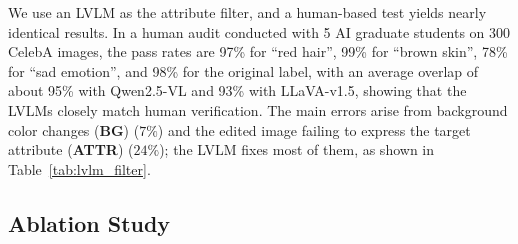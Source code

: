 \documentclass[10pt]{article} %
\newcommand{\qwen}{Qwen2.5-VL\xspace}
\newcommand{\llava}{LLaVA-v1.5\xspace}
\begin{document}
\begin{table}
\vspace{-10pt}
\centering
\setlength{\tabcolsep}{4pt}
\renewcommand{\arraystretch}{1.0}
\small
\caption{\small{Average error rates (\%) before and after LVLM filtering.}}
\label{tab:lvlm_filter}
\vspace{-8pt}
\end{table}

We use an LVLM as the attribute filter, and a human-based test yields nearly identical results. In a human audit conducted with 5 AI graduate students on 300 CelebA images, the pass rates are 97\% for ``red hair'', 99\% for ``brown skin'', 78\% for ``sad emotion'', and 98\% for the original label, with an average overlap of about 95\% with \qwen{}\citep{bai2025qwen25vl} and 93\% with \llava{}\citep{liu2023improvedllava}, showing that the LVLMs closely match human verification. The main errors arise from background color changes (\textbf{BG}) ($7\%$) and the edited image failing to express the target attribute (\textbf{ATTR}) ($24\%$); the LVLM fixes most of them, as shown in Table~\ref{tab:lvlm_filter}.

\newpage
\subsection{Ablation Study}
\label{sec:ablation}

\begin{table}
  \vspace{-15pt}
  \centering
  \setlength{\tabcolsep}{4pt}
  \renewcommand{\arraystretch}{1.0}
  \small
  \caption{Ablation on the impact of CDM and LVLM components at different scales, reported as Fix Rate (FR \%).}
  \label{tab:ablate_csd_lvlm}
  \vspace{-10pt}
\end{table}
\end{document}
